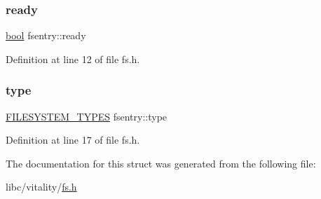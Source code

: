 \mbox{\label{a00272_a284522ed97fe1eeebd0fcc039b2ea00a_a284522ed97fe1eeebd0fcc039b2ea00a}} 
\subsubsection{\texorpdfstring{ready}{ready}}
{\footnotesize\ttfamily \hyperlink{a00140_af6a258d8f3ee5206d682d799316314b1_af6a258d8f3ee5206d682d799316314b1}{bool} fsentry\+::ready}



Definition at line 12 of file fs.\+h.

\mbox{\label{a00272_acbab3dd44174c8f74e1d9305a13c7dbb_acbab3dd44174c8f74e1d9305a13c7dbb}} 
\subsubsection{\texorpdfstring{type}{type}}
{\footnotesize\ttfamily \hyperlink{a00161_a2e9d0c3765a28910638672bfc746181b_a2e9d0c3765a28910638672bfc746181b}{F\+I\+L\+E\+S\+Y\+S\+T\+E\+M\+\_\+\+T\+Y\+P\+ES} fsentry\+::type}



Definition at line 17 of file fs.\+h.



The documentation for this struct was generated from the following file\+:\begin{DoxyCompactItemize}
\item 
libc/vitality/\hyperlink{a00152}{fs.\+h}\end{DoxyCompactItemize}
